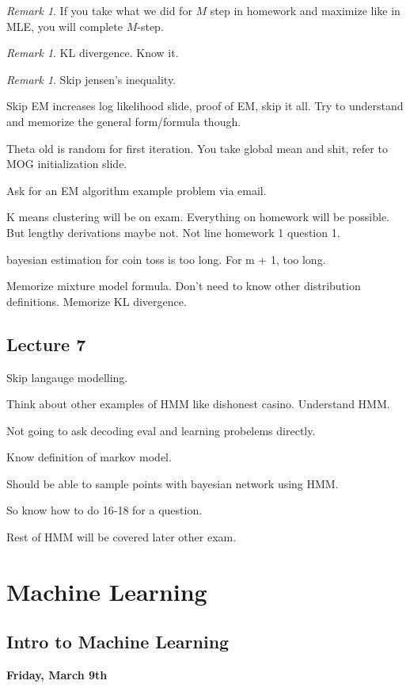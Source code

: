 \documentclass{amsbook}
\theoremstyle{plain}
\numberwithin{section}{chapter}
\numberwithin{equation}{chapter}
\theoremstyle{definition}
\theoremstyle{remark}
\newtheorem{rem}[theorem]{Remark}
\begin{document}
\begin{rem}
If you take what we did for $M$ step in homework and maximize like in MLE, you will complete $M$-step. 
\end{rem}

\begin{rem}
KL divergence. Know it. 
\end{rem}

\begin{rem}
Skip jensen's inequality. 
\end{rem}

Skip EM increases log likelihood slide, proof of EM, skip it all. Try to understand and memorize the general form/formula though. 

Theta old is random for first iteration. You take global mean and shit, refer to MOG initialization slide. 

Ask for an EM algorithm example problem via email. 

K means clustering will be on exam. Everything on homework will be possible. But lengthy derivations maybe not. Not line homework 1 question 1. 



bayesian estimation for coin toss is too long. For m + 1, too long. 


Memorize mixture model formula. Don't need to know other distribution definitions. Memorize KL divergence. 




\section{Lecture 7}

Skip langauge modelling. 

Think about other examples of HMM like dishonest casino. Understand HMM. 

Not going to ask decoding eval and learning probelems directly. 

Know definition of markov model. 


Should be able to sample points with bayesian network using HMM. 

So know how to do 16-18 for a question. 


Rest of HMM will be covered later other exam. 


\chapter{Machine Learning}
\section{Intro to Machine Learning}
\textbf{Friday, March 9th}
\end{document}
